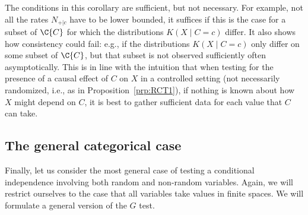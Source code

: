 The conditions in this corollary are sufficient, but not necessary. For example,
not all the rates $N_{+|c}$ have to be lower bounded, it suffices if this is
the case for a subset of $\C{C}$ for which the distributions $K(X \mid C=c)$ differ.
It also shows how consistency could fail: e.g., if the distributions
$K(X \mid C=c)$ only differ on some subset of $\C{C}$, but that subset is not 
observed sufficiently often asymptotically. This is in line with the intuition that
when testing for the presence of a causal effect of $C$ on $X$ in a controlled
setting (not necessarily randomized, i.e., as in Proposition~\ref{prp:RCT1}), if
nothing is known about how $X$ might depend on $C$, it is best to gather sufficient
data for each value that $C$ can take.




\subsection{The general categorical case}

Finally, let us consider the most general case of testing a conditional independence involving both random and
non-random variables. Again, we will restrict ourselves to the case that all variables take values in finite spaces.
We will formulate a general version of the $G$ test.


